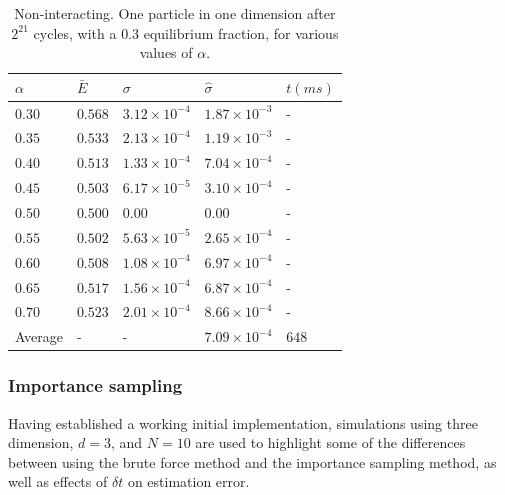 \documentclass[%
oneside,                 %
final,                   %
10pt]{article}
\begin{document}
\begin{table}[h!]
\begin{center}
\begin{tabular}{lllll}
\hline
 $\alpha$ & $\bar{E} $ & $\sigma$  & $\hat \sigma$ & $t (ms)$ \\
\hline
$0.30$ 	  & $0.568$ & $3.12 \times 10^{-4}$ & $1.87 \times 10^{-3}$ & -  \\  
$0.35$ 	  & $0.533$ & $2.13 \times 10^{-4}$ & $1.19 \times 10^{-3}$ &  - \\  
$0.40$ 	  & $0.513$ & $1.33 \times 10^{-4}$& $7.04 \times 10^{-4}$ &  - \\  
$0.45$ 	  & $0.503$ & $6.17 \times 10^{-5}$ & $3.10 \times 10^{-4}$ & - \\  
$0.50$ 	  & $0.500$ & $0.00 $ & $0.00$ & -  \\  
$0.55$ 	  & $0.502$ & $5.63 \times 10^{-5}$ & $2.65 \times 10^{-4}$ & -  \\  
$0.60$ 	  & $0.508$ & $1.08 \times 10^{-4}$ & $6.97 \times 10^{-4}$ &  - \\  
$0.65$ 	  & $0.517$ & $1.56 \times 10^{-4}$ & $6.87 \times 10^{-4}$ & -  \\  
$0.70$ 	  & $0.523$ & $2.01 \times 10^{-4}$ & $8.66 \times 10^{-4}$ & -  \\  
Average   &    -	&    -	& $7.09 \times 10^{-4}$ & $648$\\
\hline
\end{tabular}
\end{center}
\caption{Non-interacting. One particle in one dimension after $2^{21}$ cycles, with a $0.3$ equilibrium fraction, for various values of $\alpha$.}
\label{table:N1D1}
\end{table}

\subsubsection{Importance sampling}
Having established a working initial implementation, simulations using three dimension, $d=3$, and $N=10$ are used to highlight some of the differences between using the brute force method and the importance sampling method, as well as effects of $\delta t$ on estimation error.
\end{document}
